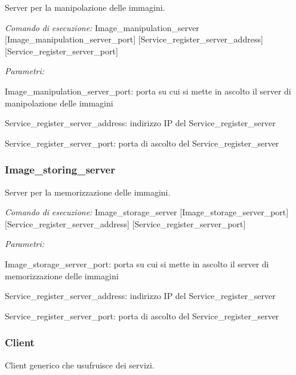 Server per la manipolazione delle immagini. \par
 {\itshape Comando} {\itshape di} {\itshape esecuzione\-:} Image\-\_\-manipulation\-\_\-server \mbox{[}Image\-\_\-manipulation\-\_\-server\-\_\-port\mbox{]} \mbox{[}Service\-\_\-register\-\_\-server\-\_\-address\mbox{]} \mbox{[}Service\-\_\-register\-\_\-server\-\_\-port\mbox{]} \par
 {\itshape Parametri\-:} 
\begin{DoxyItemize}
\item Image\-\_\-manipulation\-\_\-server\-\_\-port\-: porta su cui si mette in ascolto il server di manipolazione delle immagini
\item Service\-\_\-register\-\_\-server\-\_\-address\-: indirizzo I\-P del Service\-\_\-register\-\_\-server
\item Service\-\_\-register\-\_\-server\-\_\-port\-: porta di ascolto del Service\-\_\-register\-\_\-server
\end{DoxyItemize}\hypertarget{index_Image_storing_server}{}\subsubsection{Image\-\_\-storing\-\_\-server}\label{index_Image_storing_server}
Server per la memorizzazione delle immagini. \par
 {\itshape Comando} {\itshape di} {\itshape esecuzione\-:} Image\-\_\-storage\-\_\-server \mbox{[}Image\-\_\-storage\-\_\-server\-\_\-port\mbox{]} \mbox{[}Service\-\_\-register\-\_\-server\-\_\-address\mbox{]} \mbox{[}Service\-\_\-register\-\_\-server\-\_\-port\mbox{]} \par
 {\itshape Parametri\-:} 
\begin{DoxyItemize}
\item Image\-\_\-storage\-\_\-server\-\_\-port\-: porta su cui si mette in ascolto il server di memorizzazione delle immagini
\item Service\-\_\-register\-\_\-server\-\_\-address\-: indirizzo I\-P del Service\-\_\-register\-\_\-server
\item Service\-\_\-register\-\_\-server\-\_\-port\-: porta di ascolto del Service\-\_\-register\-\_\-server
\end{DoxyItemize}\hypertarget{index_Client}{}\subsubsection{Client}\label{index_Client}
Client generico che usufruisce dei servizi. \par
